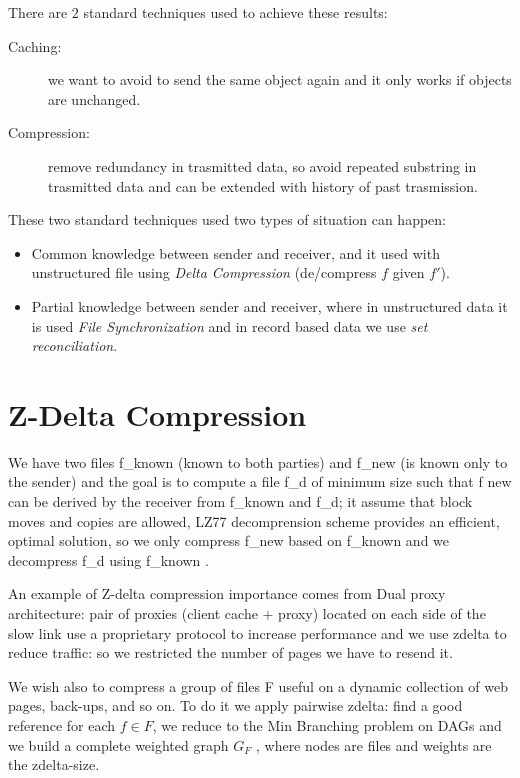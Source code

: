 There are $2$ standard techniques used to achieve these results:
\begin{description}
	\item [Caching: ] we want to avoid to send the same object again and it only works 
			  if objects are unchanged.

	\item [Compression: ] remove redundancy in trasmitted data, so avoid repeated substring in
	                      trasmitted data and can be extended with history of past trasmission.

\end{description}
These two standard techniques used two types of situation can happen:
\begin{itemize}
	\item Common knowledge between sender and receiver, and it used with unstructured file 
	      using \emph{Delta Compression} (de/compress $f$ given $f'$).
	\item Partial knowledge between sender and receiver, where in unstructured data it is used
	      \emph{File Synchronization} and in record based data we use \emph{set reconciliation}.
\end{itemize}

\section{Z-Delta Compression}
We have two files f\_known (known to both parties) and f\_new (is known only to the sender) and
the goal is to compute a file f\_d of minimum size such that f new can be derived by the receiver
from f\_known and f\_d; it assume that block moves and copies are allowed, LZ77 decomprension
scheme provides an efficient, optimal solution, so we only compress f\_new based on f\_known
and we decompress f\_d using f\_known .

An example of Z-delta compression importance comes from Dual proxy architecture:
pair of proxies (client cache + proxy) located on each side of the slow link use a 
proprietary protocol to increase performance and we use zdelta to reduce traffic:
so we restricted the number of pages we have to resend it.

We wish also to compress a group of files F useful on a dynamic collection of web pages, 
back-ups, and so on.\newline
To do it we apply pairwise zdelta: find a good reference for each $f \in F$, we reduce
to the Min Branching problem on DAGs and we build a complete weighted graph $G_F$ ,
where nodes are files and weights are the zdelta-size.

